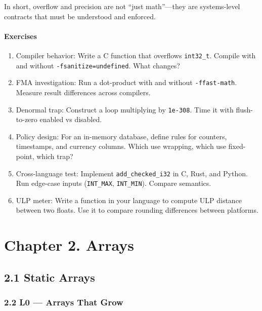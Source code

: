 \documentclass[
  letterpaper,
  DIV=11,
  numbers=noendperiod]{scrreprt}
\providecommand{\tightlist}{%
  \setlength{\itemsep}{0pt}\setlength{\parskip}{0pt}}
\begin{document}
In short, overflow and precision are not ``just math''---they are
systems-level contracts that must be understood and enforced.

\subsubsection{Exercises}\label{exercises-11}

\begin{enumerate}
\def\labelenumi{\arabic{enumi}.}
\tightlist
\item
  Compiler behavior: Write a C function that overflows
  \texttt{int32\_t}. Compile with and without
  \texttt{-fsanitize=undefined}. What changes?
\item
  FMA investigation: Run a dot-product with and without
  \texttt{-ffast-math}. Measure result differences across compilers.
\item
  Denormal trap: Construct a loop multiplying by \texttt{1e-308}. Time
  it with flush-to-zero enabled vs disabled.
\item
  Policy design: For an in-memory database, define rules for counters,
  timestamps, and currency columns. Which use wrapping, which use
  fixed-point, which trap?
\item
  Cross-language test: Implement \texttt{add\_checked\_i32} in C, Rust,
  and Python. Run edge-case inputs (\texttt{INT\_MAX},
  \texttt{INT\_MIN}). Compare semantics.
\item
  ULP meter: Write a function in your language to compute ULP distance
  between two floats. Use it to compare rounding differences between
  platforms.
\end{enumerate}


\chapter{Chapter 2. Arrays}\label{chapter-2.-arrays}

\section{2.1 Static Arrays}\label{static-arrays}

\subsection{2.2 L0 --- Arrays That Grow}\label{l0-arrays-that-grow}
\end{document}

